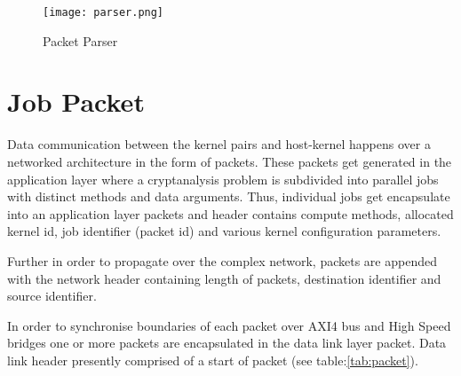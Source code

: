 \documentclass[10pt, conference, compsocconf]{IEEEtran}
\begin{document}
\begin{figure}[!htbp]
  \begin{center}
    \texttt{[image: parser.png]}
    \caption{Packet Parser}
    \label{fig:parser}
  \end{center}
\end{figure}

\section{Job Packet}

Data communication between the kernel pairs and host-kernel happens over a networked architecture in the form of packets. These packets get generated in the application layer where a cryptanalysis problem is subdivided into parallel jobs with distinct methods and data arguments. Thus, individual jobs get encapsulate into an application layer packets and header contains compute methods, allocated kernel id, job identifier (packet id) and various kernel configuration parameters.

Further in order to propagate over the complex network, packets are appended with the network header containing length of packets, destination identifier and source identifier.

In order to synchronise boundaries of each packet over AXI4 bus and High Speed bridges one or more packets are encapsulated in the data link layer packet. Data link header presently comprised of a start of packet (see table:\ref{tab:packet}).
\end{document}
